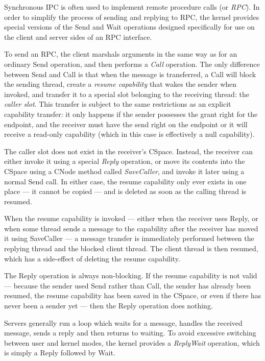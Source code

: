 Synchronous IPC is often used to implement remote procedure calls (or \emph{RPC}). In order to simplify the process of sending and replying to RPC, the kernel provides special versions of the Send and Wait operations designed specifically for use on the client and server sides of an RPC interface.

To send an RPC, the client marshals arguments in the same way as for an ordinary Send operation, and then performs a \emph{Call} operation. The only difference between Send and Call is that when the message is transferred, a Call will block the sending thread, create a \emph{resume capability} that wakes the sender when invoked, and transfer it to a special slot belonging to the receiving thread: the \emph{caller slot}. This transfer is subject to the same restrictions as an explicit capability transfer: it only happens if the sender possesses the grant right for the endpoint, and the receiver must have the send right on the endpoint or it will receive a read-only capability (which in this case is effectively a null capability).

The caller slot does not exist in the receiver's CSpace. Instead, the receiver can either invoke it using a special \emph{Reply} operation, or move its contents into the CSpace using a CNode method called \emph{SaveCaller}, and invoke it later using a normal Send call. In either case, the resume capability only ever exists in one place --- it cannot be copied --- and is deleted as soon as the calling thread is resumed.

When the resume capability is invoked --- either when the receiver uses Reply, or when some thread sends a message to the capability after the receiver has moved it using SaveCaller --- a message transfer is immediately performed between the replying thread and the blocked client thread. The client thread is then resumed, which has a side-effect of deleting the resume capability.

The Reply operation is always non-blocking. If the resume capability is not valid --- because the sender used Send rather than Call, the sender has already been resumed, the resume capability has been saved in the CSpace, or even if there has never been a sender yet --- then the Reply operation does nothing.

Servers generally run a loop which waits for a message, handles the received message, sends a reply and then returns to waiting. To avoid excessive switching between user and kernel modes, the kernel provides a \emph{ReplyWait} operation, which is simply a Reply followed by Wait.

